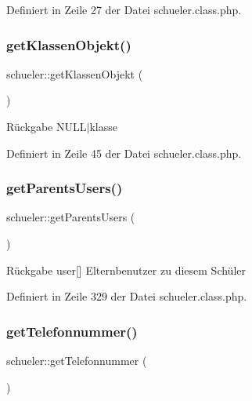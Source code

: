 Definiert in Zeile 27 der Datei schueler.\+class.\+php.

\mbox{\label{classschueler_a1360a1c7bf78396acdca86108b3c73cf}} 
\subsubsection{\texorpdfstring{get\+Klassen\+Objekt()}{getKlassenObjekt()}}
{\footnotesize\ttfamily schueler\+::get\+Klassen\+Objekt (\begin{DoxyParamCaption}{ }\end{DoxyParamCaption})}

\begin{DoxyReturn}{Rückgabe}
N\+U\+L\+L$\vert$klasse 
\end{DoxyReturn}


Definiert in Zeile 45 der Datei schueler.\+class.\+php.

\mbox{\label{classschueler_a686353fb18b91baaf9bd0886ad7ce207}} 
\subsubsection{\texorpdfstring{get\+Parents\+Users()}{getParentsUsers()}}
{\footnotesize\ttfamily schueler\+::get\+Parents\+Users (\begin{DoxyParamCaption}{ }\end{DoxyParamCaption})}

\begin{DoxyReturn}{Rückgabe}
user\mbox{[}\mbox{]} Elternbenutzer zu diesem Schüler 
\end{DoxyReturn}


Definiert in Zeile 329 der Datei schueler.\+class.\+php.

\mbox{\label{classschueler_a9cb9ec61630594d551d619d8dddaf973}} 
\subsubsection{\texorpdfstring{get\+Telefonnummer()}{getTelefonnummer()}}
{\footnotesize\ttfamily schueler\+::get\+Telefonnummer (\begin{DoxyParamCaption}{ }\end{DoxyParamCaption})}

